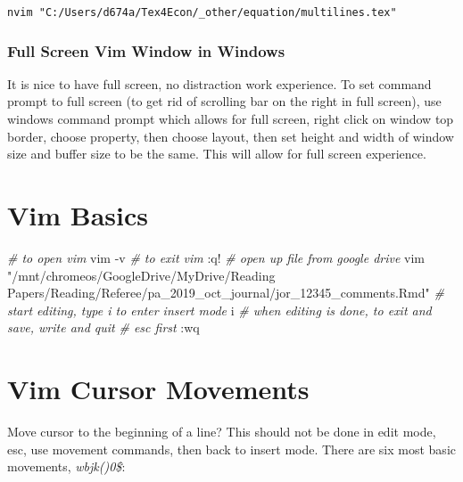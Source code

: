 \documentclass[]{article}
\newenvironment{Shaded}{\begin{snugshade}}{\end{snugshade}}
\newcommand{\CommentTok}[1]{\textcolor[rgb]{0.56,0.35,0.01}{\textit{#1}}}
\newcommand{\ExtensionTok}[1]{#1}
\newcommand{\NormalTok}[1]{#1}
\newcommand{\StringTok}[1]{\textcolor[rgb]{0.31,0.60,0.02}{#1}}
\begin{document}
\begin{verbatim}
nvim "C:/Users/d674a/Tex4Econ/_other/equation/multilines.tex"
\end{verbatim}

\hypertarget{full-screen-vim-window-in-windows}{%
\subsubsection{Full Screen Vim Window in
Windows}\label{full-screen-vim-window-in-windows}}

It is nice to have full screen, no distraction work experience. To set
command prompt to full screen (to get rid of scrolling bar on the right
in full screen), use windows command prompt which allows for full
screen, right click on window top border, choose property, then choose
layout, then set height and width of window size and buffer size to be
the same. This will allow for full screen experience.

\hypertarget{vim-basics}{%
\section{Vim Basics}\label{vim-basics}}

\begin{Shaded}
\begin{Highlighting}[]
\CommentTok{# to open vim}
\ExtensionTok{vim}\NormalTok{ -v}
\CommentTok{# to exit vim}
\NormalTok{:}\ExtensionTok{q}\NormalTok{!}
\CommentTok{# open up file from google drive}
\ExtensionTok{vim} \StringTok{"/mnt/chromeos/GoogleDrive/MyDrive/Reading Papers/Reading/Referee/pa_2019_oct_journal/jor_12345_comments.Rmd"}
\CommentTok{# start editing, type i to enter insert mode}
\ExtensionTok{i}
\CommentTok{# when editing is done, to exit and save, write and quit}
\CommentTok{# esc first}
\NormalTok{:}\ExtensionTok{wq}
\end{Highlighting}
\end{Shaded}

\hypertarget{vim-cursor-movements}{%
\section{Vim Cursor Movements}\label{vim-cursor-movements}}

Move cursor to the beginning of a line? This should not be done in edit
mode, esc, use movement commands, then back to insert mode. There are
six most basic movements, \emph{wbjk()0\$}:
\end{document}
